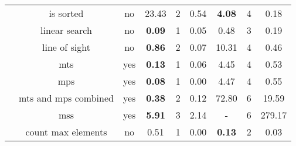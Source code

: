 \begin{table}
{\begin{tabular}[h]{|c|c|c|c|c|c||c|c|c|}
			 & is sorted & no & 23.43 & 2 & 0.54 & {\bfseries 4.08} & 4 & 0.18\\ 
			 & linear search & no & {\bfseries 0.09} & 1 & 0.05 & 0.48 & 3 & 0.19\\ 
			 & line of sight & no & {\bfseries 0.86} & 2 & 0.07 & 10.31 & 4 & 0.46\\ 
			 & mts & yes & {\bfseries 0.13} & 1 & 0.06 & 4.45 & 4 & 0.53\\ 
			 & mps & yes & {\bfseries 0.08} & 1 & 0.00 & 4.47 & 4 & 0.55\\ 
			 & mts and mps combined & yes & {\bfseries 0.38} & 2 & 0.12 & 72.80 & 6 & 19.59\\ 
			 & mss & yes & {\bfseries 5.91} & 3 & 2.14 & - & 6 & 279.17\\ 
			 & count max elements & no & 0.51 & 1 & 0.00 & {\bfseries 0.13} & 2 & 0.03\\ 
			\hline
		\end{tabular}
	}
\end{table}
